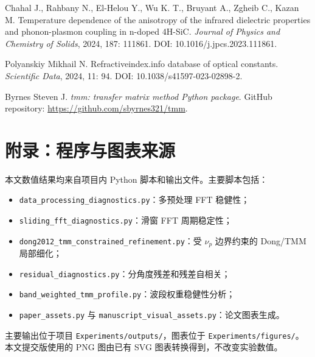 \documentclass[UTF8,a4paper,12pt]{ctexart}
\begin{document}
\begin{enumerate}[label={[\arabic*]}]
  \item Chahal J., Rahbany N., El-Helou Y., Wu K. T., Bruyant A., Zgheib C., Kazan M. Temperature dependence of the anisotropy of the infrared dielectric properties and phonon-plasmon coupling in n-doped 4H-SiC. \textit{Journal of Physics and Chemistry of Solids}, 2024, 187: 111861. DOI: 10.1016/j.jpcs.2023.111861.
  \item Polyanskiy Mikhail N. Refractiveindex.info database of optical constants. \textit{Scientific Data}, 2024, 11: 94. DOI: 10.1038/s41597-023-02898-2.
  \item Byrnes Steven J. \textit{tmm: transfer matrix method Python package}. GitHub repository: \url{https://github.com/sbyrnes321/tmm}.
\end{enumerate}

\appendix
\section{附录：程序与图表来源}

本文数值结果均来自项目内 Python 脚本和输出文件。主要脚本包括：
\begin{itemize}
  \item \texttt{data\_processing\_diagnostics.py}：多预处理 FFT 稳健性；
  \item \texttt{sliding\_fft\_diagnostics.py}：滑窗 FFT 周期稳定性；
  \item \texttt{dong2012\_tmm\_constrained\_refinement.py}：受 $\nu_p$ 边界约束的 Dong/TMM 局部细化；
  \item \texttt{residual\_diagnostics.py}：分角度残差和残差自相关；
  \item \texttt{band\_weighted\_tmm\_profile.py}：波段权重稳健性分析；
  \item \texttt{paper\_assets.py} 与 \texttt{manuscript\_visual\_assets.py}：论文图表生成。
\end{itemize}

主要输出位于项目 \texttt{Experiments/outputs/}，图表位于 \texttt{Experiments/figures/}。本文提交版使用的 PNG 图由已有 SVG 图表转换得到，不改变实验数值。
\end{document}
